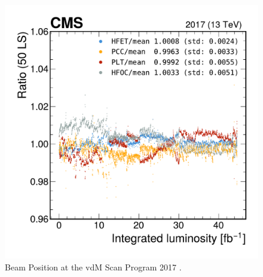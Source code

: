 \begin{figure}[h]
  \hspace{-1.9cm}
  \begin{minipage}{0.48\textwidth}
    \centering
    \includegraphics[scale=.4]{Chapter3/2017_stability/ratio__hfet-pcc-plt-hfocdivmean_PCConly.pdf}
    \raggedleft
    \caption[Doros]{Beam Position at the vdM Scan Program 2017 \cite{lhc_complex}.}
    \label{BeamPosition_2017}
  \end{minipage}
  \hspace{1cm} %
  \begin{minipage}{0.48\textwidth}
    \centering
\end{minipage}
\end{figure}
